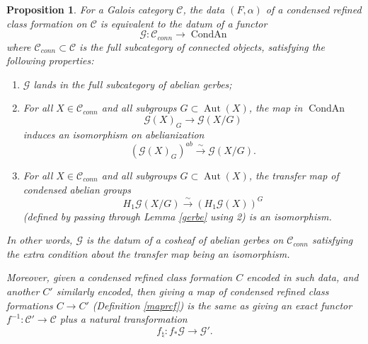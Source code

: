\documentclass[12pt]{article}
\newtheorem{proposition}[theorem]{Proposition}
\theoremstyle{definition}
\newcommand{\on}{\operatorname}
\newcommand{\mc}{\mathcal}
\begin{document}
\begin{proposition}\label{rcfgerbe}
For a Galois category $\mc{C}$, the data $(F,\alpha)$ of a condensed refined class formation on $\mc{C}$ is equivalent to the datum of a functor
$$\mc{G}:\mc{C}_{conn}\to\on{CondAn}$$
where $\mc{C}_{conn}\subset\mc{C}$ is the full subcategory of connected objects, satisfying the following properties:
\begin{enumerate}
\item $\mc{G}$ lands in the full subcategory of abelian gerbes;
\item For all $X\in\mc{C}_{conn}$ and all subgroups $G\subset\on{Aut}(X)$, the map in $\on{CondAn}$
$$\mc{G}(X)_G \to \mc{G}(X/G)$$
induces an isomorphism on abelianization
$$(\mc{G}(X)_G)^{ab} \overset{\sim}{\rightarrow} \mc{G}(X/G).$$
\item For all $X\in\mc{C}_{conn}$ and all subgroups $G\subset\on{Aut}(X)$, the transfer map of condensed abelian groups
$$H_1\mc{G}(X/G)\overset{\sim}{\rightarrow} \left(H_1\mc{G}(X)\right)^G$$
(defined by passing through Lemma \ref{gerbe} using 2) is an isomorphism.
\end{enumerate}
In other words, $\mc{G}$ is the datum of a cosheaf of abelian gerbes on $\mc{C}_{conn}$ satisfying the extra condition about the transfer map being an isomorphism.

Moreover, given a condensed refined class formation $C$ encoded in such data, and another $C'$ similarly encoded, then giving a map of condensed refined class formations $C \to C'$ (Definition \ref{maprcf}) is the same as giving an exact functor $f^{-1}:\mc{C}'\to\mc{C}$ plus a natural transformation
$$f_\natural: f_\ast\mc{G} \to \mc{G}'.$$
\end{proposition}
\end{document}
